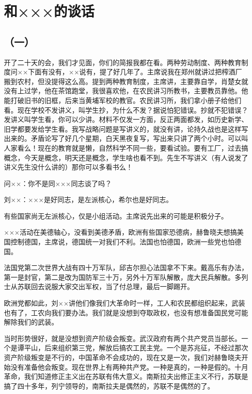 \section[和×××的谈话（一九六四年六月八日）]{和×××的谈话}
\subsection{（一）}


开了二十天的会，我们才见面，你们的简报我都在看。两种劳动制度、两种教育制度问××下面有没有，××说有，提了好几年了。主席说我在郑州就讲过把榨酒厂搬到农村，但没提得这么高。提到两种教育制度，主席讲，主要靠自学，肖楚女就没有上过学，他在茶馆跑堂，我很喜欢他，在农民讲习所教书，主要教员靠他。他能打破旧书的旧框，后来当黄埔军校的教官。农民讲习所，我们拿小册子给他们看。现在学校不发讲义，叫学生抄，为什么不发？据说怕犯错误。抄就不犯错误？发讲义叫学生看，你可以少讲。材料不仅发一方面，反正两面都发，如历史新学、旧学都要发给学生看。我写战略问题是写讲义的，就没有讲，论持久战也是这样写出来的。矛盾论写了好几个星期，白天黑夜复写，写出来只讲了两个小时。可以叫人家看么！现在的教育就是懒，自然科学不同一些，要看试验。要有工厂，过去搞概念，今天是概念，明天还是概念，学生啥也看不到。先生不写讲义（有人说发了讲义先生没什么讲的）那你可以多看书么！

问××：你不是同×××同志谈了吗？

刘××：×××是好同志，是左派核心，希尔也是好同志。

有些国家尚无左派核心，仅是小组活动。主席说先出来的可能是积极分子。

×××活动在美德轴心，没看到美德矛盾，欧洲有些国家恐德病，赫鲁晓夫想搞美国控制德国，主席说，德国统一对我们不利。法国也怕德国，欧洲一些党也怕德国。

法国党第二次世界大战有四十万军队，邱吉尔担心法国拿不下来。戴高乐有办法，第一是封官，第二是改为国防军三十万，另外十万军队解散，庞大民兵解散。多列士从苏联回去说服大家交出军权，当了付总理，最后一脚踢开。

欧洲党都如此，刘××讲他们像我们大革命时一样，工人和农民都组织起来，武装也有了，工农向我们要办法。我们就是没想到夺取政权，也没有想准备国民党可能解除我们的武装。

当时形势很好，就是没想到资产阶级会叛变。武汉政府有两个共产党员当部长。一个是谭平山，后来组织第三党，解放后搞农工民主党。一个是苏兆征，不经过那次资产阶级叛变是不行的，中国革命不会成功的，现在又是一次，我们对赫鲁晓夫开始没有准备他会叛变。现在世界上有两种共产党。一种是真的，一种是假的。十月革命，我们知道修正主义出在苏联有伟大意义。南斯拉夫出修正主义不行，苏联是搞了四十多年，列宁领导的，南斯拉夫是偶然的，苏联不是偶然的了。

